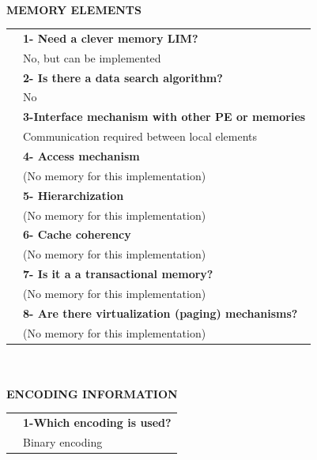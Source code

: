    \newpage{\large \textbf{\qquad }}\vspace{10pt}\\
   {\large \textbf{MEMORY ELEMENTS}}\vspace{10pt}\\\begin{tabular}{ p{0.2cm} p{14.5cm}}
   	&\textbf{1- Need a clever memory LIM?}\\
   	&	No, but can be implemented\vspace{7pt}\\
   	&\textbf{2- Is there a data search algorithm?}\\
   	&	No\vspace{7pt}\\
   	&\textbf{	3-Interface mechanism with other PE or memories}\\
   	&	Communication required between local elements\vspace{7pt}\\
   	&	\textbf{4- Access mechanism}\\
   	&	(No memory for this implementation)\vspace{7pt}\\
   	&	\textbf{5- Hierarchization} \\
   	&	(No memory for this implementation)\vspace{7pt}\\
   	&\textbf{	6- Cache coherency} \\
   	&	(No memory for this implementation)\vspace{7pt}\\
   	&\textbf{	7- Is it a a transactional memory?}\\
   	&	(No memory for this implementation)\vspace{7pt}\\
   	&\textbf{	8- Are there virtualization (paging) mechanisms?}\\
   	&	(No memory for this implementation)\end{tabular}\vspace{14pt}\\
   \vspace{10pt}\\
   {\large\textbf{ENCODING INFORMATION}}\vspace{10pt}\\
   \begin{tabular}{ p{0.2cm} p{14.5cm}}
   	&\textbf{1-Which encoding is used?}\\
   	&Binary encoding
   \end{tabular}
